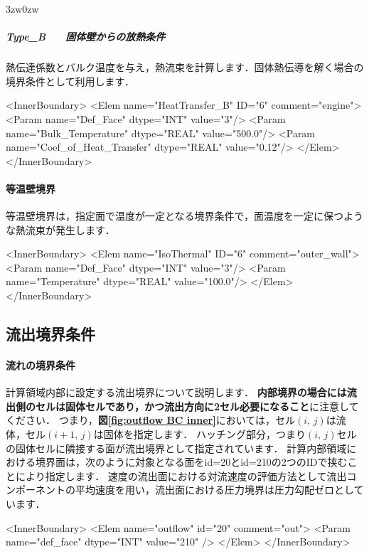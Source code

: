 \begin{indentation}{3zw}{0zw}
%
\subparagraph{Type\_B　　固体壁からの放熱条件}
熱伝達係数とバルク温度を与え，熱流束を計算します．固体熱伝導を解く場合の境界条件として利用します．

{\small
\begin{program}
<InnerBoundary>
  <Elem name="HeatTransfer_B" ID="6" comment="engine">
    <Param name="Def_Face"              dtype="INT"    value="3"/>
    <Param name="Bulk_Temperature"      dtype="REAL"   value="500.0"/>
    <Param name="Coef_of_Heat_Transfer" dtype="REAL"   value="0.12"/>
  </Elem>
</InnerBoundary>
\end{program}
}

\end{indentation}


%
\paragraph{等温壁境界}
等温壁境界は，指定面で温度が一定となる境界条件で，面温度を一定に保つような熱流束が発生します．

{\small
\begin{program}
<InnerBoundary>
  <Elem name="IsoThermal" ID="6" comment="outer_wall">
    <Param name="Def_Face"    dtype="INT"    value="3"/>
    <Param name="Temperature" dtype="REAL"   value="100.0"/>
  </Elem>
</InnerBoundary>
\end{program}
}


\subsection{流出境界条件}

\paragraph{流れの境界条件}
計算領域内部に設定する流出境界について説明します．
\textbf{内部境界の場合には流出側のセルは固体セルであり，かつ流出方向に2セル必要になること}に注意してください．
つまり，\textbf{図\ref{fig:outflow BC inner}}においては，セル$(i,\,j)$は流体，セル$(i+1,\,j)$は固体を指定します．
ハッチング部分，つまり$(i,\,j)$セルの固体セルに隣接する面が流出境界として指定されています．
計算内部領域における境界面は，次のように対象となる面をid=20とid=210の2つのIDで挟むことにより指定します．
速度の流出面における対流速度の評価方法として流出コンポーネントの平均速度を用い，流出面における圧力境界は圧力勾配ゼロとしています．

{\small
\begin{program}
<InnerBoundary> 
  <Elem name="outflow" id="20" comment="out">
    <Param name="def_face"    dtype="INT"    value="210" />
  </Elem>
</InnerBoundary>
\end{program}
}

